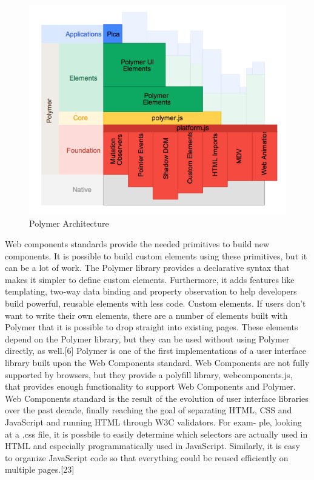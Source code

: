 \begin{figure}[htb]
 \centering
 \includegraphics[width=1.0\linewidth]{images/chapter2/polymer-architecture.png}\hfill
 \caption[Polymer Architecture]{Polymer Architecture}
 \label{fig:fourV}
\end{figure}
Web components standards provide the needed primitives to build new components. It is possible to build custom elements using these primitives, but it can be a lot of work.
The Polymer library provides a declarative syntax that makes it simpler to define custom elements. Furthermore, it adds features like templating, two-way data binding and property observation to help developers build powerful, reusable elements with less code.
Custom elements. If users don’t want to write their own elements, there are a number of elements built with Polymer that it is possible to drop straight into existing pages. These elements depend on the Polymer library, but they can be used without using Polymer directly, as well.[6]
\newline
Polymer is one of the first implementations of a user interface library  built upon the Web Components standard. Web Components are not fully supported by browsers, but they provide a polyfill library, webcomponents.js, that provides enough functionality to support Web Components and Polymer.
\newline
Web Components standard is the result of the evolution of user interface libraries over the past decade, finally reaching the goal of separating HTML, CSS and JavaScript and running HTML through W3C validators. For exam- ple, looking at a .css file, it is possbile to easily determine which selectors are actually used in HTML and especially programmatically used in JavaScript. Similarly, it is easy to organize JavaScript code so that everything could be reused efficiently on multiple pages.[23]